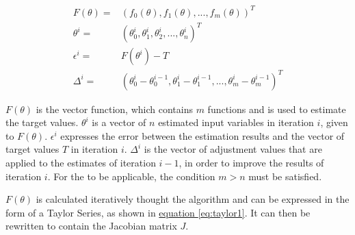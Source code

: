 \begin{align}
	F(\theta) =& (f_0(\theta), f_1(\theta),...,f_m(\theta))^T \\
	\theta^{i} =& (\theta^{i}_0, \theta^{i}_1, \theta^{i}_2,...,\theta^{i}_n)^T \\
	\epsilon^{i} =& F(\theta^{i}) - T \\
	\Delta^{i} =& (\theta^{i}_0 - \theta^{i-1}_0, \theta^{i}_1 - \theta^{i-1}_1, ..., \theta^{i}_m - \theta^{i-1}_m)^T %
\end{align}

$F(\theta)$ is the vector function, which contains $m$ functions and is
used to estimate the target values. $\theta^i$ is a vector of $n$ estimated input variables in iteration $i$, given to $F(\theta)$.
$\epsilon^i$ expresses the error between the estimation results and the vector of target values $T$ in iteration $i$.
$\Delta^i$ is the vector of adjustment values that are applied to the estimates of  iteration $i-1$, in order to improve the results of iteration $i$.
For the  to be applicable, the condition $m > n$ must be satisfied.\newline

$F(\theta)$ is calculated iteratively thought the algorithm and can be expressed in the form of a Taylor Series, as shown in
\hyperref[eq:taylor1]{equation \ref*{eq:taylor1}}. It can then be rewritten to contain the Jacobian matrix $J$.

